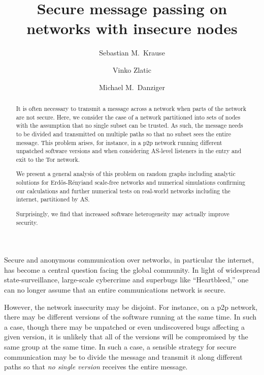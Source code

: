 \documentclass[aps, prl, twocolumn, a4paper, floatfix]{revtex4}
\newcommand{\er}{Erd\H{o}s-R\'{e}nyi}
\begin{document}
\title{Secure message passing on networks with insecure nodes}
\author{Sebastian M.\ Krause}
\author{Vinko Zlatic}
\author{Michael M.\ Danziger}


\begin{abstract}
It is often necessary to transmit a message across a network when parts of the network are not secure.
Here, we consider the case of a network partitioned into sets of nodes with the assumption that no single subset can be trusted.
As such, the message needs to be divided and transmitted on multiple paths so that no subset sees the entire message.
This problem arises, for instance, in a p2p network running different unpatched software versions 
and when considering AS-level listeners in the entry and exit to the Tor network.

We present a general analysis of this problem on random graphs including analytic solutions for \er and scale-free networks and numerical simulations confirming our calculations and further numerical tests on real-world networks including the internet, partitioned by AS.

Surprisingly, we find that increased software heterogeneity may actually improve security.
\end{abstract}
\maketitle

Secure and anonymous communication over networks, in particular the internet, has become a central question facing the global community.
In light of widespread state-surveillance, large-scale cybercrime and superbugs like ``Heartbleed,'' one can no longer assume that an entire communications network is secure.

However, the network insecurity may be disjoint.  
For instance, on a p2p network, there may be different versions of the software running at the same time.  
In such a case, though there may be unpatched or even undiscovered bugs affecting a given version, it is unlikely that all of the versions will be compromised by the same group at the same time.
In such a case, a sensible strategy for secure communication may be to divide the message and transmit it along different paths so that \textit{no single version} receives the entire message.
\end{document}
